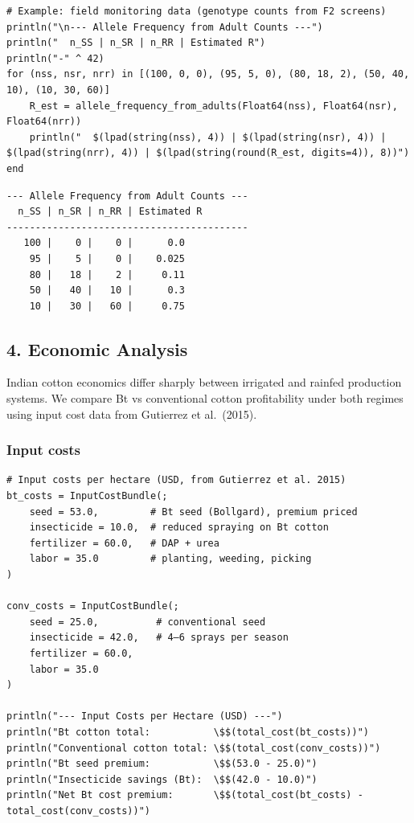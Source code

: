 \begin{verbatim}
# Example: field monitoring data (genotype counts from F2 screens)
println("\n--- Allele Frequency from Adult Counts ---")
println("  n_SS | n_SR | n_RR | Estimated R")
println("-" ^ 42)
for (nss, nsr, nrr) in [(100, 0, 0), (95, 5, 0), (80, 18, 2), (50, 40, 10), (10, 30, 60)]
    R_est = allele_frequency_from_adults(Float64(nss), Float64(nsr), Float64(nrr))
    println("  $(lpad(string(nss), 4)) | $(lpad(string(nsr), 4)) | $(lpad(string(nrr), 4)) | $(lpad(string(round(R_est, digits=4)), 8))")
end
\end{verbatim}




\begin{verbatim}
--- Allele Frequency from Adult Counts ---
  n_SS | n_SR | n_RR | Estimated R
------------------------------------------
   100 |    0 |    0 |      0.0
    95 |    5 |    0 |    0.025
    80 |   18 |    2 |     0.11
    50 |   40 |   10 |      0.3
    10 |   30 |   60 |     0.75
\end{verbatim}



\subsection{4. Economic Analysis}



\label{12213710312640133979}{}


Indian cotton economics differ sharply between irrigated and rainfed production systems. We compare Bt vs conventional cotton profitability under both regimes using input cost data from Gutierrez et al.~(2015).



\subsubsection{Input costs}



\label{2362325390190756702}{}



\begin{verbatim}
# Input costs per hectare (USD, from Gutierrez et al. 2015)
bt_costs = InputCostBundle(;
    seed = 53.0,         # Bt seed (Bollgard), premium priced
    insecticide = 10.0,  # reduced spraying on Bt cotton
    fertilizer = 60.0,   # DAP + urea
    labor = 35.0         # planting, weeding, picking
)

conv_costs = InputCostBundle(;
    seed = 25.0,          # conventional seed
    insecticide = 42.0,   # 4–6 sprays per season
    fertilizer = 60.0,
    labor = 35.0
)

println("--- Input Costs per Hectare (USD) ---")
println("Bt cotton total:           \$$(total_cost(bt_costs))")
println("Conventional cotton total: \$$(total_cost(conv_costs))")
println("Bt seed premium:           \$$(53.0 - 25.0)")
println("Insecticide savings (Bt):  \$$(42.0 - 10.0)")
println("Net Bt cost premium:       \$$(total_cost(bt_costs) - total_cost(conv_costs))")
\end{verbatim}




